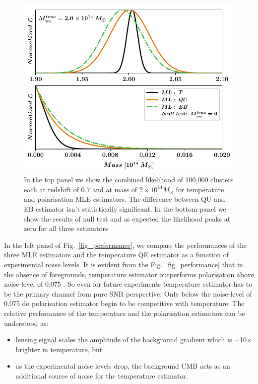  \begin{figure}[t]
\includegraphics[width=\linewidth, keepaspectratio]{figs/fig0-eps-converted-to.pdf}
 \caption{In the top panel we show the combined likelihood of 100,000 clusters each at redshift of 0.7 and at mass of $2\times 10^{14} M_{\odot}$ for temperature and polarisation MLE estimators. The difference between QU and EB estimator isn't statistically significant. In the bottom panel we show the results of null test and as expected the likelihood peaks at zero for all three estimators}
\label{lkhd_curve}
 \end{figure}
 
 In the left panel of Fig.~\ref{fig_performance}, we compare the performances of the three MLE estimators and the temperature QE estimator as a function of experimental noise levels. 
 It is evident from the Fig.~\ref{fig_performance} that in the absence of foregrounds, temperature estimator outperforms polarisation above noise-level of 0.075 \ukam.
 So even for future experiments temperature estimator has to be the primary channel from pure SNR perspective.
 Only below the noise-level of  0.075 \ukam do polarisation estimator begin to be competitive with temperature.
 The relative performance of the temperature and the polarisation estimators can be understood as:
 \begin{itemize}
 \item lensing signal scales the amplitude of the background gradient which is $\sim$10$\times$ brighter in temperature, but
 \item as the experimental noise levels drop, the background CMB acts as an additional source of noise for the temperature estimator.
 \end{itemize}
 
